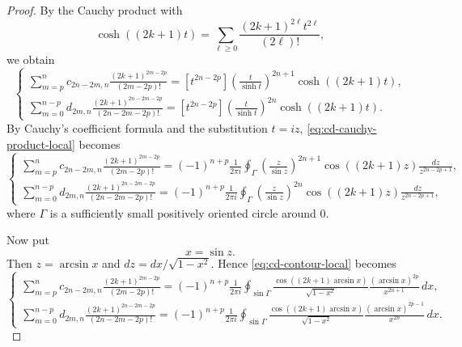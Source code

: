 \documentclass[11pt,twoside]{article}
\numberwithin{equation}{section}
\begin{document}
\begin{proof}
By the Cauchy product with
\[
\cosh((2k+1)t)
=
\sum_{\ell\ge0}
\frac{(2k+1)^{2\ell}t^{2\ell}}{(2\ell)!},
\]
we obtain
\begin{equation}\label{eq:cd-cauchy-product-local}
\begin{cases}
\displaystyle
\sum_{m=p}^{n}
c_{2n-2m,n}
\frac{(2k+1)^{2m-2p}}{(2m-2p)!}
=
[t^{2n-2p}]
\left(\frac{t}{\sinh t}\right)^{2n+1}
\cosh((2k+1)t),
\\[2.6em]
\displaystyle
\sum_{m=0}^{n-p}
d_{2m,n}
\frac{(2k+1)^{2n-2m-2p}}
{(2n-2m-2p)!}
=
[t^{2n-2p}]
\left(\frac{t}{\sinh t}\right)^{2n}
\cosh((2k+1)t).
\end{cases}
\end{equation}
By Cauchy's coefficient formula and the substitution \(t=iz\),
\eqref{eq:cd-cauchy-product-local} becomes
\begin{equation}\label{eq:cd-contour-local}
\begin{cases}
\displaystyle
\sum_{m=p}^{n}
c_{2n-2m,n}
\frac{(2k+1)^{2m-2p}}{(2m-2p)!}
=
(-1)^{n+p}
\frac{1}{2\pi i}
\oint_{\Gamma}
\left(\frac{z}{\sin z}\right)^{2n+1}
\cos((2k+1)z)
\frac{dz}{z^{2n-2p+1}},
\\[3.0em]
\displaystyle
\sum_{m=0}^{n-p}
d_{2m,n}
\frac{(2k+1)^{2n-2m-2p}}
{(2n-2m-2p)!}
=
(-1)^{n+p}
\frac{1}{2\pi i}
\oint_{\Gamma}
\left(\frac{z}{\sin z}\right)^{2n}
\cos((2k+1)z)
\frac{dz}{z^{2n-2p+1}},
\end{cases}
\end{equation}
where \(\Gamma\) is a sufficiently small positively oriented circle around
\(0\).

Now put
\[
x=\sin z.
\]
Then \(z=\arcsin x\) and \(dz=dx/\sqrt{1-x^2}\). Hence
\eqref{eq:cd-contour-local} becomes
\begin{equation}\label{eq:cd-after-sine-substitution-local}
\begin{cases}
\displaystyle
\sum_{m=p}^{n}
c_{2n-2m,n}
\frac{(2k+1)^{2m-2p}}{(2m-2p)!}
=
(-1)^{n+p}
\frac{1}{2\pi i}
\oint_{\sin\Gamma}
\frac{\cos((2k+1)\arcsin x)}{\sqrt{1-x^2}}
\frac{(\arcsin x)^{2p}}{x^{2n+1}}\,dx,
\\[3.0em]
\displaystyle
\sum_{m=0}^{n-p}
d_{2m,n}
\frac{(2k+1)^{2n-2m-2p}}
{(2n-2m-2p)!}
=
(-1)^{n+p}
\frac{1}{2\pi i}
\oint_{\sin\Gamma}
\frac{\cos((2k+1)\arcsin x)}{\sqrt{1-x^2}}
\frac{(\arcsin x)^{2p-1}}{x^{2n}}\,dx.
\end{cases}
\end{equation}


\end{proof}
\end{document}
